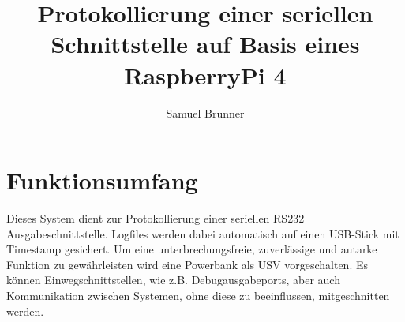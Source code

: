 \documentclass{article}
\title{Protokollierung einer seriellen Schnittstelle auf Basis eines RaspberryPi 4}
\author{Samuel Brunner}
\begin{document}
\maketitle

\section{Funktionsumfang}
Dieses System dient zur Protokollierung einer seriellen RS232 Ausgabeschnittstelle. 
Logfiles werden dabei automatisch auf einen USB-Stick mit Timestamp gesichert. 
Um eine unterbrechungsfreie, zuverlässige und autarke Funktion zu gewährleisten wird eine Powerbank als USV vorgeschalten. Es können Einwegschnittstellen, wie z.B. Debugausgabeports, aber auch Kommunikation zwischen Systemen, ohne diese zu beeinflussen, mitgeschnitten werden.
\end{document}

